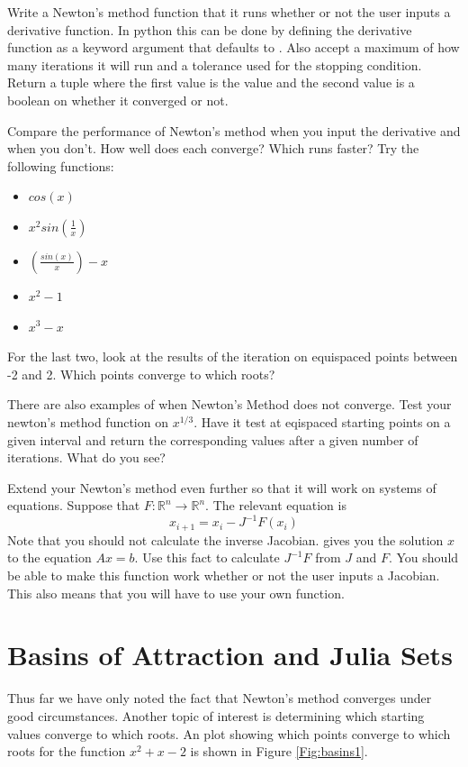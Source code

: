 \begin{problem}
\label{prob:newton_arr}
Write a Newton's method function that it runs whether or not the user inputs a derivative function.
In python this can be done by defining the derivative function as a keyword argument that defaults to .
Also accept a maximum of how many iterations it will run and a tolerance used for the stopping condition.
Return a tuple where the first value is the value and the second value is a boolean on whether it converged or not.

Compare the performance of Newton's method when you input the derivative and when you don't.
How well does each converge?
Which runs faster?
Try the following functions:

\begin{itemize}
\item $cos(x)$
\item $x^2sin(\frac{1}{x})$
\item $(\frac{sin(x)}{x})-x$
\item $x^2-1$
\item $x^3 - x$
\end{itemize}

For the last two, look at the results of the iteration on equispaced points between -2 and 2.
Which points converge to which roots?

There are also examples of when Newton's Method does not converge.
Test your newton's method function on $x^{1/3}$.
Have it test at eqispaced starting points on a given interval and return the corresponding values after a given number of iterations.
What do you see?
\end{problem}

\begin{problem}
Extend your Newton's method even further so that it will work on systems of equations.
Suppose that $F: \mathbb{R}^n \rightarrow \mathbb{R}^n $.
The relevant equation is
\[
x_{i+1} = x_i - J^{-1}F(x_i)
\]
Note that you should not calculate the inverse Jacobian.
 gives you the solution $x$ to the equation $Ax=b$.
Use this fact to calculate $J^{-1}F$ from $J$ and $F$.
You should be able to make this function work whether or not the user inputs a Jacobian.
This also means that you will have to use your own  function.
\end{problem}

\section*{Basins of Attraction and Julia Sets}
Thus far we have only noted the fact that Newton's method converges under good circumstances.
Another topic of interest is determining which starting values converge to which roots.
An plot showing which points converge to which roots for the function $x^2 + x - 2$ is shown in Figure \ref{Fig:basins1}.

